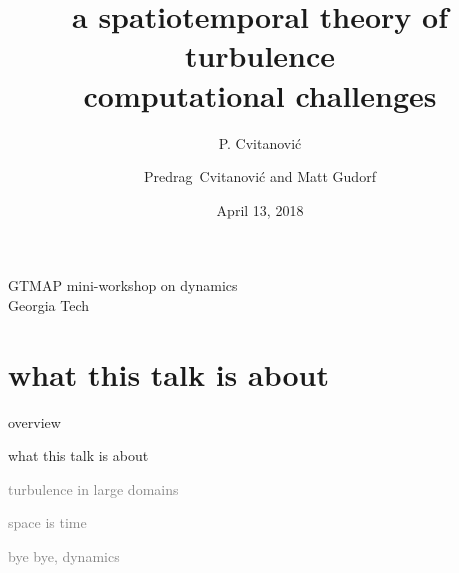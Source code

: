 


\usepackage[font=scriptsize, labelfont=bf]{caption}
\usepackage[
    backend=biber,  %
    sorting=nyt,
    style=numeric, %
    natbib=true,
    style=phys, %
    biblabel= brackets, %
    articletitle=false, %
    pageranges = true , %
    sortlocale=en_US,
    firstinits=true,
    url=false, %
    doi=false, %
    eprint=false
]{biblatex}


\renewcommand{\Ssym}[1]{{\ensuremath{m_{#1}}}}    %




\title{
{a spatiotemporal theory of}
{\huge turbulence}
    \\
{computational challenges}
}
\author{P. Cvitanovi\'c}
\author[Cvitanovi\'c]
{
  \textcolor{green!50!black}{
  {Predrag~Cvitanovi\'c
  and
  Matt Gudorf
  }	%
  }
}
\institute
{
GTMAP mini-workshop on dynamics
\\
                Georgia Tech
 }
\date{April 13, 2018}

\begin{frame}
  \titlepage
\end{frame}


\section[what this talk is about]
 {what this talk is about}

\begin{frame}{overview}
\begin{enumerate}
              \item {\Large
what this talk is about
                  }\textcolor{gray}{\small
              \item
turbulence in large domains
              \item
space is time
              \item
bye bye, dynamics
                    }
            \end{enumerate}
\end{frame}

